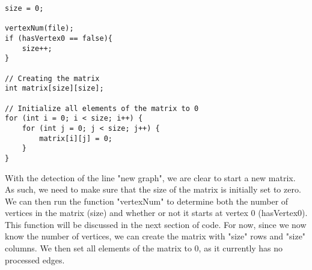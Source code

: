 \documentclass{article}
\begin{document}
\begin{lstlisting}
size = 0;

vertexNum(file);
if (hasVertex0 == false){
    size++;
}

// Creating the matrix
int matrix[size][size];

// Initialize all elements of the matrix to 0
for (int i = 0; i < size; i++) {
    for (int j = 0; j < size; j++) {
        matrix[i][j] = 0;
    }
}
\end{lstlisting}
With the detection of the line "new graph", we are clear to start a new matrix. As such, we need to make sure that the size of the matrix is initially set to zero. We can then run the function "vertexNum" to determine both the number of vertices in the matrix (size) and whether or not it starts at vertex 0 (hasVertex0). This function will be discussed in the next section of code. For now, since we now know the number of vertices, we can create the matrix with "size" rows and "size" columns. We then set all elements of the matrix to 0, as it currently has no processed edges. \\
\end{document}
